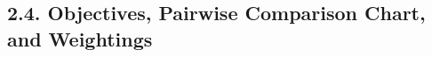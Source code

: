 \documentclass[10pt]{article}
\begin{document}
\subsection{2.4. Objectives, Pairwise Comparison Chart, and Weightings}
%
%
%
%
%
%
%
%
%
%
%
%
%
%
%
%
%
%
%
%
%
%
%
%
%
\end{document}

